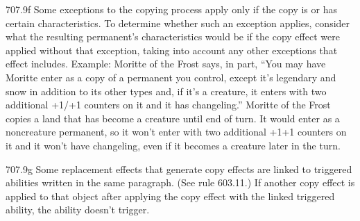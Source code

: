707.9f Some exceptions to the copying process apply only if the copy is or has certain characteristics. To determine whether such an exception applies, consider what the resulting permanent’s characteristics would be if the copy effect were applied without that exception, taking into account any other exceptions that effect includes.
Example: Moritte of the Frost says, in part, “You may have Moritte enter as a copy of a permanent you control, except it’s legendary and snow in addition to its other types and, if it’s a creature, it enters with two additional +1/+1 counters on it and it has changeling.” Moritte of the Frost copies a land that has become a creature until end of turn. It would enter as a noncreature permanent, so it won’t enter with two additional +1+1 counters on it and it won’t have changeling, even if it becomes a creature later in the turn.

707.9g Some replacement effects that generate copy effects are linked to triggered abilities written in the same paragraph. (See rule 603.11.) If another copy effect is applied to that object after applying the copy effect with the linked triggered ability, the ability doesn’t trigger.

